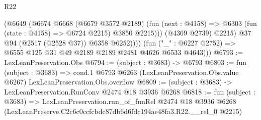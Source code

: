 \begin{lexlean}{R22}
\begin{coremodule}
                  (@6649
                    (@6674
                      @6668
                      (@6679 @3572 @2189)
                      (fun (next : @4158) =>
                      @6303 (fun (state : @4158) => @6724 @2215) @3850 @2215)))
                  (@4369 @2739)
                  @2215)
                @37
                @94
                (@2517 (@2528 @37))
                @6358
                @6252))))
        (fun ("_" : @6227 @2752) => @6555 @125 @31 @49 @2189 @2189 @2481 @4626 @6533 @4643)))
@6793 := LexLeanPreservation.Obs
@6794 := (subject : @3683) -> @6793
@6803 := fun (subject : @3683) =>
  cond.{1} @6793 @6263 (LexLeanPreservation.Obs.value @6267) LexLeanPreservation.Obs.overflow
@6809 := (subject : @3683) -> LexLeanPreservation.RunConv @2474 @18 @3936 @6268
@6818 := fun (subject : @3683) =>
  LexLeanPreservation.run_of_funRel
    @2474
    @18
    @3936
    @6268
    (LexLeanPreserve.C2c6c0ccfcbdc87db6d6fdc194ae48fa3.R22.__rel_0 @2215)
\end{coremodule}
\end{lexlean}
